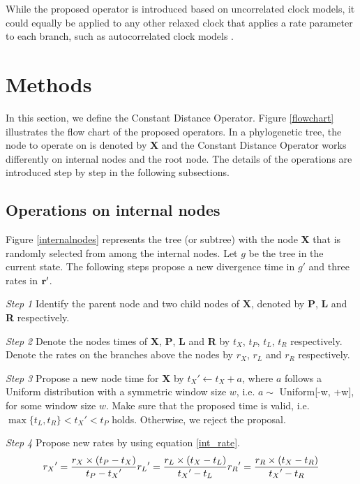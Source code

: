 \documentclass{bmcart}
\begin{document}
While the proposed operator is introduced based on uncorrelated clock models, it could equally be applied to any other relaxed clock that applies a rate parameter to each branch, such as autocorrelated clock models \cite{thorne1998estimating}.

\section*{Methods}
In this section, we define the Constant Distance Operator. Figure \ref{flowchart} illustrates the flow chart of the proposed operators. In a phylogenetic tree, the node to operate on is denoted by \textbf{X} and the Constant Distance Operator works differently on internal nodes and the root node. The details of the operations are introduced step by step in the following subsections.
\subsection*{Operations on internal nodes}
Figure \ref{internalnodes} represents the tree (or subtree) with the node \textbf{X} that is randomly selected from among the internal nodes. Let $g$ be the tree in the current state. The following steps propose a new divergence time in ${g}'$ and three rates in $\bf{r}'$.

\emph{Step 1} Identify the parent node and two child nodes of \textbf{X}, denoted by \textbf{P}, \textbf{L} and \textbf{R} respectively.

\emph{Step 2} Denote the nodes times of \textbf{X}, \textbf{P}, \textbf{L} and \textbf{R} by $t_X$, $t_P$, $t_L$, $t_R$ respectively. Denote the rates on the branches above the nodes by $r_X$, $r_L$ and $r_R$ respectively.

\emph{Step 3} Propose a new node time for \textbf{X} by ${t_X}' \leftarrow {t_X} + a$, where $a$ follows a Uniform distribution with a symmetric window size $w$, i.e. $a \sim$ Uniform[-w, +w], for some window size $w$. Make sure that the proposed time is valid, i.e. $\max \{ {t_L},{t_R}\}  < {t_X}' < {t_P}$ holds. Otherwise, we reject the proposal.

\emph{Step 4} Propose new rates by using equation \ref{int_rate}.
\begin{equation}
 \label{int_rate}
{r_X}' = \frac{{r_X} \times ({{t_P} - {t_X}})}{{{t_P} - {t_X}'}}\\
{r_L}' = \frac{{{r_L} \times ({{t_X} - {t_L}})}}{{{t_X}' - {t_L}}}\\
{r_R}' = \frac{{{r_R} \times ({{t_X} - {t_R}})}}{{{t_X}' - {t_R}}}
 \end{equation}
\end{document}
